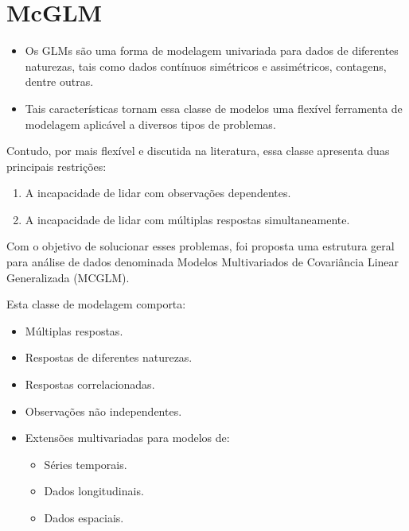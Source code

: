 \documentclass[10pt,
  aspectratio=169,
  serif,
  mathserif,
  professionalfont,
  compress,
  handout,
  ]{beamer}\usepackage[]{graphicx}\usepackage[]{color}
\begin{document}

\section{McGLM}

\begin{frame}[c, allowframebreaks]

\begin{itemize}
  \item Os GLMs são uma forma de modelagem univariada para dados de diferentes naturezas, tais como dados contínuos simétricos e assimétricos, contagens, dentre outras. 
  \item Tais características tornam essa classe de modelos uma flexível ferramenta de modelagem aplicável a diversos tipos de problemas.
\end{itemize}

Contudo, por mais flexível e discutida na literatura, essa classe apresenta duas principais restrições: 

\begin{enumerate}
  \item A incapacidade de lidar com observações dependentes.
  \item A incapacidade de lidar com múltiplas respostas simultaneamente.
\end{enumerate}

\framebreak

Com o objetivo de solucionar esses problemas, foi proposta uma estrutura geral para análise de dados denominada Modelos Multivariados de Covariância Linear Generalizada (MCGLM).

Esta classe de modelagem comporta:
\begin{itemize}
  \item Múltiplas respostas.
  \item Respostas de diferentes naturezas.
  \item Respostas correlacionadas.
  \item Observações não independentes.
  \item Extensões multivariadas para modelos de:
    \begin{itemize}
      \item Séries temporais.
      \item Dados longitudinais.
      \item Dados espaciais.
    \end{itemize}

\end{itemize}

\end{frame}
\end{document}
